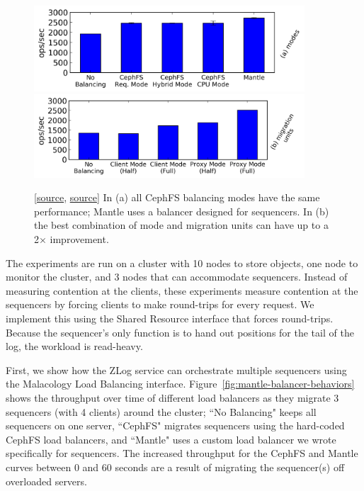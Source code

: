 \begin{figure}[t!]
\centering
\includegraphics[width=0.9\textwidth]{./chapters/controlplane/malacology/figures/mantle-balancer-performance.png}
\includegraphics[width=0.9\textwidth]{./chapters/controlplane/malacology/figures/mantle-mode-performance.png}
\caption{
[\href{https://github.com/michaelsevilla/malacology-popper/blob/v2.1/experiments/mds-zlog-seq-migrate-redux-3client/results-mantle-runs/visualize.ipynb}{source},
\href{https://github.com/michaelsevilla/malacology-popper/blob/v2.1/experiments/mds-zlog-seq-migrate-redux-waves/results-paper/visualize.ipynb}{source}]
In (a) all CephFS balancing modes have the same performance; Mantle uses a
balancer designed for sequencers. In (b) the best combination of mode and
migration units can have up to a 2\(\times\)
improvement.}\label{fig:mantle-balancer-performance}
\end{figure}

The experiments are run on a cluster with 10 nodes to store objects, one node
to monitor the cluster, and 3 nodes that can accommodate sequencers.  Instead
of measuring contention at the clients, these experiments measure
contention at the sequencers by forcing clients to make round-trips for every
request. We implement this using the Shared Resource interface that forces
round-trips.  Because the sequencer's only function is to  hand out positions
for the tail of the log, the workload is read-heavy.

First, we show how the ZLog service can orchestrate multiple sequencers using
the Malacology Load Balancing interface.
Figure~\ref{fig:mantle-balancer-behaviors} shows the throughput over time of
different load balancers as they migrate 3 sequencers (with 4 clients) around
the cluster; ``No Balancing" keeps all sequencers on one server, ``CephFS"
migrates sequencers using the hard-coded CephFS load balancers, and ``Mantle"
uses a custom load balancer we wrote specifically for sequencers.  The
increased throughput for the CephFS and Mantle curves between 0 and 60 seconds
are a result of migrating the sequencer(s) off overloaded servers.

